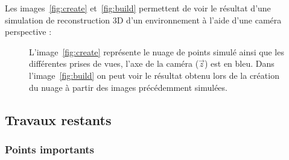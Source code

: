 \vspace{5mm}
Les images~\ref{fig:create} et~\ref{fig:build} permettent de voir le résultat d'une simulation de reconstruction 3D d'un environnement à l'aide d'une caméra perspective :
\begin{figure}[htp]
\begin{center}
\caption{L'image~\ref{fig:create} représente le nuage de points simulé ainsi que les différentes prises de vues, l'axe de la caméra ($\vec{z}$) est en bleu. Dans l'image~\ref{fig:build} on peut voir le résultat obtenu lors de la création du nuage à partir des images précédemment simulées.}
\end{center}
\end{figure}
\subsection{Travaux restants}

\subsubsection{Points importants}

